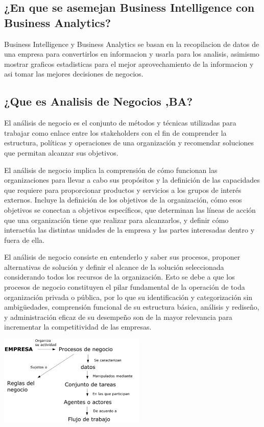 \documentclass[twoside,twocolumn]{article}
\begin{document}
\subsection{¿En que se asemejan Business Intelligence con Business Analytics?}
Business Intelligence y Business Analytics se basan en la recopilacion de datos de una empresa para convertirlos en informacion y usarla para los analisis, asimismo mostrar graficos estadisticas para el mejor aprovechamiento de la informacion y asi tomar las mejores decisiones de negocios.










\subsection{¿Que es Analisis de Negocios ,BA?}
El análisis de negocio es el conjunto de métodos y técnicas utilizadas para trabajar como enlace entre los stakeholders con el fin de comprender la estructura, políticas y operaciones de una organización y recomendar soluciones que permitan alcanzar sus objetivos.

El análisis de negocio implica la comprensión de cómo funcionan las organizaciones para llevar a cabo sus propósitos y la definición de las capacidades que requiere para proporcionar productos y servicios a los grupos de interés externos. Incluye la definición de los objetivos de la organización, cómo esos objetivos se conectan a objetivos específicos, que determinan las líneas de acción que una organización tiene que realizar para alcanzarlos, y definir cómo interactúa las distintas unidades de la empresa y las partes interesadas dentro y fuera de ella.

El análisis de negocio consiste en entenderlo y saber sus procesos, proponer alternativas de solución y definir el alcance de la solución seleccionada considerando todos los recursos de la organización. Esto se debe a que los procesos de negocio constituyen el pilar fundamental de la operación de toda organización privada o pública, por lo que su identificación y categorización sin ambigüedades, comprensión funcional de su estructura básica, análisis y rediseño, y administración eficaz de su desempeño son de la mayor relevancia para incrementar la competitividad de las empresas.


\begin{center}
	\includegraphics[width=7cm]{./Imagenes/AnalisisNegocio} 
\end{center}
\end{document}
